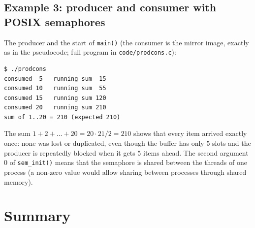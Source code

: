 \documentclass[11pt,a4paper]{article}
\newcommand{\cmd}[1]{\texttt{#1}}
\begin{document}
\subsection{Example 3: producer and consumer with POSIX semaphores}
\label{sec:prodcons}

The producer and the start of \texttt{main()} (the consumer is the mirror image, exactly as in the pseudocode; full program in \texttt{code/prodcons.c}):


\begin{lstlisting}[style=term]
$ ./prodcons
consumed  5   running sum  15
consumed 10   running sum  55
consumed 15   running sum 120
consumed 20   running sum 210
sum of 1..20 = 210 (expected 210)
\end{lstlisting}

The sum $1+2+\dots+20 = 20\cdot21/2 = 210$ shows that every item arrived exactly once: none was lost or duplicated, even though the buffer has only $5$ slots and the producer is repeatedly blocked when it gets $5$ items ahead. The second argument $0$ of \cmd{sem\_init()} means that the semaphore is shared between the threads of one process (a non-zero value would allow sharing between processes through shared memory).

\section{Summary}
\end{document}
